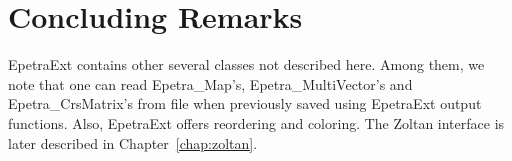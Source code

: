 \section{Concluding Remarks}
\label{sec:epetraext_concluding}

EpetraExt contains other several classes not described here. Among them, we
note that one can read Epetra\_Map's, Epetra\_MultiVector's and
Epetra\_CrsMatrix's from file when previously saved using EpetraExt output
functions. Also, EpetraExt offers reordering and coloring. The Zoltan
interface is later described in Chapter~\ref{chap:zoltan}.
